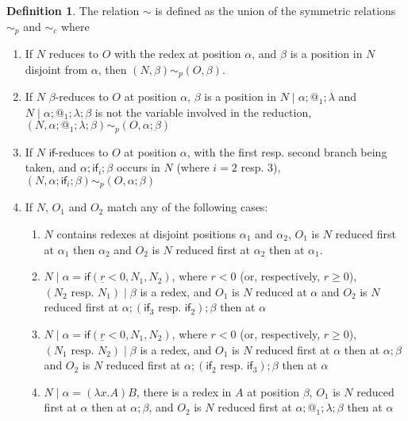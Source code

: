 \documentclass{article}
\newcommand{\tif}[3]{\mathsf{if}(#1, #2, #3)} %
\theoremstyle{definition}
\newtheorem{definition}{Definition}
\theoremstyle{lemma}
\theoremstyle{remark}
\begin{document}
\begin{definition}
The relation $\sim$ is defined as the union of the symmetric relations $\sim_p$  and $\sim_c$  where
\begin{enumerate}
    \item If $N$ reduces to $O$ with the redex at position $\alpha$, and $\beta$ is a position in $N$ disjoint from $\alpha$, then $(N,\beta) \sim_p (O,\beta)$.
    
    \item If $N$ $\beta$-reduces to $O$ at position $\alpha$, $\beta$ is a position in $N \mid \alpha;@_1;\lambda$ and $N \mid \alpha;@_1;\lambda;\beta$ is not the variable involved in the reduction, $(N,\alpha;@_1;\lambda;\beta) \sim_p (O, \alpha;\beta)$
    
    \item If $N$ $\textsf{if}$-reduces to $O$ at position $\alpha$, with the first resp. second branch being taken, and $\alpha;\textsf{if}_i;\beta$ occurs in $N$ (where $i = 2$ resp. $3$), $(N,\alpha;\textsf{if}_i;\beta) \sim_p (O,\alpha;\beta)$
    
    \item If $N$, $O_1$ and $O_2$ match any of the following cases:
    \begin{enumerate}
        \item $N$ contains redexes at disjoint positions $\alpha_1$ and $\alpha_2$, $O_1$ is $N$ reduced first at $\alpha_1$ then $\alpha_2$ and $O_2$ is $N$ reduced first at $\alpha_2$ then at $\alpha_1$.
        
        \item $N \mid \alpha = \tif{\underline r < 0}{N_1}{N_2}$, where $r < 0$ (or, respectively, $r \geq 0$), $(N_2 \text{ resp. } N_1) \mid \beta$ is a redex, and $O_1$ is $N$ reduced at $\alpha$ and $O_2$ is $N$ reduced first at $\alpha;(\textsf{if}_3 \text{ resp. } \textsf{if}_2);\beta$ then at $\alpha$
        
        \item $N \mid \alpha = \tif{\underline r < 0}{N_1}{N_2}$, where $r < 0$ (or, respectively, $r \geq 0$), $(N_1 \text{ resp. } N_2) \mid \beta$ is a redex, and $O_1$ is $N$ reduced first at $\alpha$ then at $\alpha;\beta$ and $O_2$ is $N$ reduced first at $\alpha;(\textsf{if}_2 \text{ resp. } \textsf{if}_3);\beta$ then at $\alpha$
        
        \item $N \mid \alpha = (\lambda x. A) B$, there is a redex in $A$ at position $\beta$, $O_1$ is $N$ reduced first at $\alpha$ then at $\alpha;\beta$, and $O_2$ is $N$ reduced first at $\alpha;@_1;\lambda;\beta$ then at $\alpha$
        

\end{enumerate}
\end{enumerate}
\end{definition}
\end{document}
